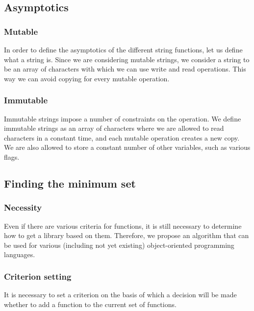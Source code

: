 \documentclass[anonymous,sigplan,review,11pt,nonacm,natbib=false]{acmart}
\begin{document}
    \subsection{Asymptotics}

    \subsubsection{Mutable}

    In order to define the asymptotics of the different string functions, let us define what a string is. Since we are considering mutable strings, we consider a string to be an array of characters with which we can use write and read operations. This way we can avoid copying for every mutable operation.

    \subsubsection{Immutable}

    Immutable strings impose a number of constraints on the operation. We define immutable strings as an array of characters where we are allowed to read characters in a constant time, and each mutable operation creates a new copy. We are also allowed to store a constant number of other variables, such as various flags.

    \subsection{Finding the minimum set}

    \subsubsection{Necessity}

    Even if there are various criteria for functions, it is still necessary to determine how to get a library based on them. Therefore, we propose an algorithm that can be used for various (including not yet existing) object-oriented programming languages.

    \subsubsection{Criterion setting}

    \label{criterion}

    It is necessary to set a criterion on the basis of which a decision will be made whether to add a function to the current set of functions.
\end{document}
